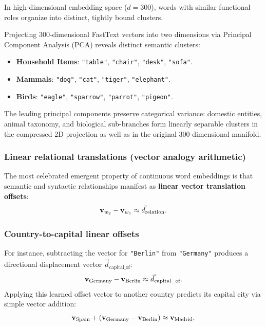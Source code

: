 \documentclass[../../main.tex]{subfiles}
\begin{document}
In high-dimensional embedding space ($d = 300$), words with similar functional roles organize into distinct, tightly bound clusters.

Projecting 300-dimensional FastText vectors into two dimensions via Principal Component Analysis (PCA) reveals distinct semantic clusters:
\begin{itemize}
    \item \textbf{Household Items}: \texttt{"table"}, \texttt{"chair"}, \texttt{"desk"}, \texttt{"sofa"}.
    \item \textbf{Mammals}: \texttt{"dog"}, \texttt{"cat"}, \texttt{"tiger"}, \texttt{"elephant"}.
    \item \textbf{Birds}: \texttt{"eagle"}, \texttt{"sparrow"}, \texttt{"parrot"}, \texttt{"pigeon"}.
\end{itemize}
The leading principal components preserve categorical variance: domestic entities, animal taxonomy, and biological sub-branches form linearly separable clusters in the compressed 2D projection as well as in the original 300-dimensional manifold.

\subsubsection{Linear relational translations (vector analogy arithmetic)}
\label{subsec:relational_analogies}

The most celebrated emergent property of continuous word embeddings is that semantic and syntactic relationships manifest as \textbf{linear vector translation offsets}:
\begin{equation}
\label{eq:relational_offset_concept}
\mathbf{v}_{w_2} - \mathbf{v}_{w_1} \approx \vec{d}_{\text{relation}}.
\end{equation}

\subsubsection{Country-to-capital linear offsets}
For instance, subtracting the vector for \texttt{"Berlin"} from \texttt{"Germany"} produces a directional displacement vector $\vec{d}_{\text{capital\_of}}$:
\begin{equation}
\label{eq:rel_germany_berlin}
\mathbf{v}_{\text{Germany}} - \mathbf{v}_{\text{Berlin}} \approx \vec{d}_{\text{capital\_of}}.
\end{equation}
Applying this learned offset vector to another country predicts its capital city via simple vector addition:
\begin{equation}
\label{eq:rel_spain_madrid}
\mathbf{v}_{\text{Spain}} + (\mathbf{v}_{\text{Germany}} - \mathbf{v}_{\text{Berlin}}) \approx \mathbf{v}_{\text{Madrid}}.
\end{equation}
\end{document}
